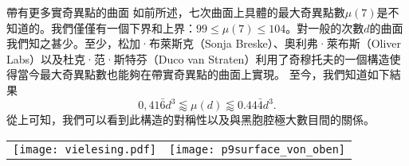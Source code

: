 \begin{surferPage}[216奇異點]{帶有更多實奇異點的曲面}
如前所述，七次曲面上具體的最大奇異點數$\mu(7)$是不知道的。我們僅僅有一個下界和上界：$99\le \mu(7) \le 104$。對一般的次數$d$的曲面我們知之甚少。至少，松加·布萊斯克（Sonja Breske）、奧利弗·萊布斯（Oliver Labs）以及杜克·范·斯特芬（Duco van Straten）利用了奇穆托夫的一個構造使得當今最大奇異點數也能夠在帶實奇異點的曲面上實現。
至今，我們知道如下結果\[0,41\bar{6}d^3 \lessapprox \mu(d) \lessapprox 0.44\bar{4} d^3.\]
從上可知，我們可以看到此構造的對稱性以及與黑胞腔極大數目間的關係。
 \begin{center}
      \begin{tabular}{c@{\qquad}c}
        \texttt{[image: vielesing.pdf]}
        &
        \texttt{[image: p9surface\_von\_oben]}
      \end{tabular}
    \end{center}
\end{surferPage}
